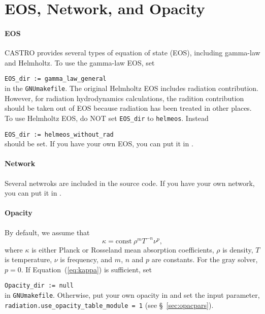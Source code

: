 \documentclass[11pt,letterpaper]{article}
\begin{document}
\section{EOS, Network, and Opacity}

\paragraph{EOS} CASTRO provides several types of equation of state
(EOS), including gamma-law and Helmholtz.  To use the gamma-law EOS, set 
\vspace{5pt}

\verb|EOS_dir := gamma_law_general|\\[5pt]
in the {\tt GNUmakefile}.  The original Helmholtz EOS includes
radiation contribution.  However, for radiation hydrodynamics
calculations, the radition contribution should be taken out of EOS
because radiation has been treated in other places.  To use Helmholtz
EOS, do NOT set \verb|EOS_dir| to {\tt helmeos}.  Instead \vspace{5pt}

\verb|EOS_dir := helmeos_without_rad|\\[5pt]
should be set.  If you have your own
EOS, you can put it in {\tt{}}.

\paragraph{Network} Several netwroks are included in the source code.  If
you have your own network, you can put it in
{\tt{}}.

\paragraph{Opacity} By default, we assume that
\begin{equation}
  \kappa = \mathrm{const}\ \rho^{m} T^{-n} \nu^{p} , \label{eq:kappa}
\end{equation}
where $\kappa$ is either Planck or Rosseland mean absorption
coefficients, $\rho$ is density, $T$ is temperature, $\nu$ is
frequency, and $m$, $n$ and $p$ are constants.  For the gray solver,
$p = 0$.  If Equation~(\ref{eq:kappa}) is sufficient, set \vspace{5pt}

\verb|Opacity_dir := null|\\[5pt]
in {\tt GNUmakefile}.  Otherwise, put your own opacity in
{\tt{}} and set
the input parameter, {\tt radiation.use\_opacity\_table\_module = 1} (see
\S~\ref{sec:opacpars}). 
\end{document}
